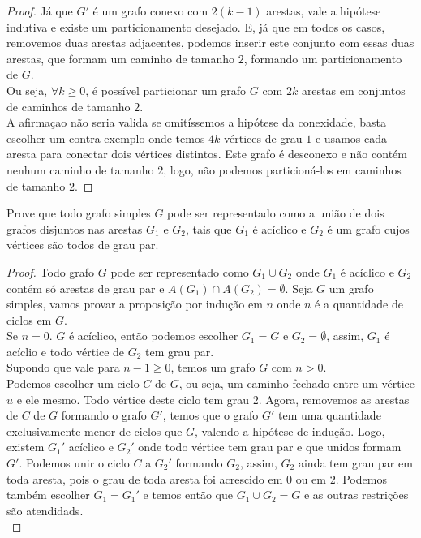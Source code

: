 \documentclass[12pt]{article}
\newenvironment{problem}[2][Ex]{\begin{trivlist}
\item[\hskip \labelsep {\bfseries #1}\hskip \labelsep {\bfseries #2.}]}{\end{trivlist}}
\begin{document}
\begin{proof}
Já que $G'$ é um grafo conexo com $2(k-1)$ arestas, vale a hipótese indutiva e existe um particionamento desejado. E, já que em todos os casos, removemos duas arestas adjacentes, podemos inserir este conjunto com essas duas arestas, que formam um caminho de tamanho $2$, formando um particionamento de $G$. \\
Ou seja, $\forall k \geq 0$, é possível particionar um grafo $G$ com $2k$ arestas em conjuntos de caminhos de tamanho $2$. \\
A afirmaçao não seria valida se omitíssemos a hipótese da conexidade, basta escolher um contra exemplo onde temos $4k$ vértices de grau $1$ e usamos cada aresta para conectar dois vértices distintos. Este grafo é desconexo e não contém nenhum caminho de tamanho $2$, logo, não podemos particioná-los em caminhos de tamanho $2$.
\end{proof}

\begin{problem}{E8}
Prove que todo grafo simples $G$ pode ser representado como a união de dois grafos disjuntos nas arestas $G_1$ e $G_2$, tais que $G_1$ é acíclico e $G_2$ é um grafo cujos vértices são todos de grau par. \\
\end{problem}

\begin{proof}
Todo grafo $G$ pode ser representado como $G_1 \cup G_2$ onde $G_1$ é acíclico e $G_2$ contém só arestas de grau par e $A(G_1) \cap A(G_2) = \emptyset$. Seja $G$ um grafo simples, vamos provar a proposição por indução em $n$ onde $n$ é a quantidade de ciclos em $G$. \\
Se $n = 0$. $G$ é acíclico, então podemos escolher $G_1 = G$ e $G_2 = \emptyset$, assim, $G_1$ é acíclio e todo vértice de $G_2$ tem grau par. \\
Supondo que vale para $n - 1 \geq 0$, temos um grafo $G$ com $n > 0$. \\
Podemos escolher um ciclo $C$ de $G$, ou seja, um caminho fechado entre um vértice $u$ e ele mesmo. Todo vértice deste ciclo tem grau $2$. Agora, removemos as arestas de $C$ de $G$ formando o grafo $G'$, temos que o grafo $G'$ tem uma quantidade exclusivamente menor de ciclos que $G$, valendo a hipótese de indução. Logo, existem $G_1'$ acíclico e $G_2'$ onde todo vértice tem grau par e que unidos formam $G'$. Podemos unir o ciclo $C$ a $G_2'$ formando $G_2$, assim, $G_2$ ainda tem grau par em toda aresta, pois o grau de toda aresta foi acrescido em $0$ ou em $2$. Podemos também escolher $G_1 = G_1'$ e temos então que $G_1 \cup G_2 = G$ e as outras restrições são atendidads. \\
\end{proof}
\end{document}
